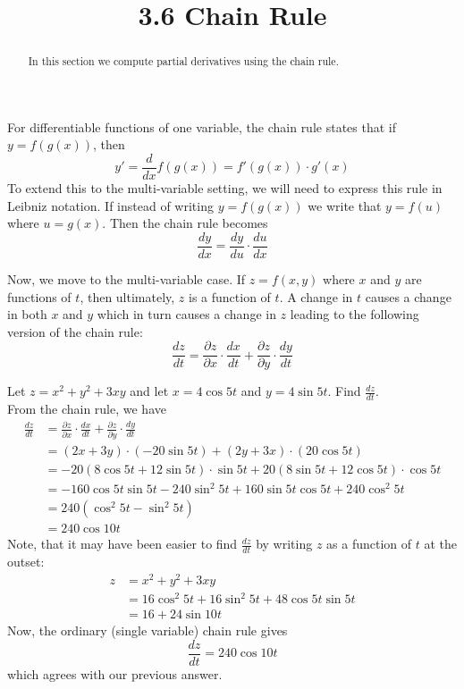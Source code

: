 \documentclass[handout]{ximera}
\title{3.6 Chain Rule}
\begin{document}
\begin{abstract}
In this section we compute partial derivatives using the chain rule.
\end{abstract}

\maketitle

For differentiable functions of one variable, the chain rule states that if $y = f(g(x))$, then 
\[
y' = \frac{d}{dx} f(g(x)) = f'(g(x)) \cdot g'(x)
\]
To extend this to the multi-variable setting, we will need to express this rule in Leibniz notation.
If instead of writing $y = f(g(x))$ we write that $y = f(u)$ where $ u = g(x)$.
Then the chain rule becomes
\[
\frac{dy}{dx} = \frac{dy}{du} \cdot \frac{du}{dx}
\]





Now, we move to the multi-variable case. If $z = f(x,y)$ where $x$ and $y$ are functions of $t$, then ultimately, $z$ is a function of $t$.
A change in $t$ causes a change in both $x$ and $y$ which in turn causes a change in $z$ leading to the following version of the chain rule:
\[
\frac{dz}{dt} = \frac{\partial z}{\partial x} \cdot \frac{dx}{dt} + \frac{\partial z}{\partial y} \cdot \frac{dy}{dt}
\]

\begin{example}[Example 1]
Let $z = x^2 + y^2 + 3xy$ and let $x = 4\cos 5t$ and $y = 4\sin 5t$. Find $\frac{dz}{dt}$.\\
From the chain rule, we have
\begin{align*}
\frac{dz}{dt} &= \frac{\partial z}{\partial x} \cdot \frac{dx}{dt} + \frac{\partial z}{\partial y} \cdot \frac{dy}{dt}\\
              &= \left(2x + 3y\right) \cdot \left(-20 \sin 5t\right) + \left(2y + 3x\right) \cdot \left(20 \cos 5t\right)\\
              &= -20(8 \cos 5t + 12 \sin 5t) \cdot \sin 5t  + 20 (8 \sin 5t + 12 \cos 5t) \cdot \cos 5t \\
              &= -160 \cos 5t \sin 5t -240 \sin^2 5t + 160 \sin 5t \cos 5t + 240 \cos^2 5t\\
              &= 240 (\cos^2 5t - \sin^2 5t)\\
              &= 240 \cos 10t
\end{align*}
Note, that it may have been easier to find $\frac{dz}{dt}$ by writing $z$ as a function of $t$ at the outset:
\begin{align*}
z &= x^2 + y^2 + 3xy \\
   &= 16 \cos^2 5t + 16 \sin^2 5t + 48 \cos 5t \sin 5t\\
   & = 16 + 24 \sin 10t
\end{align*}
Now, the ordinary (single variable) chain rule gives
\[
\frac{dz}{dt} = 240 \cos 10t
\]
which agrees with our previous answer.
\end{example}
\end{document}
